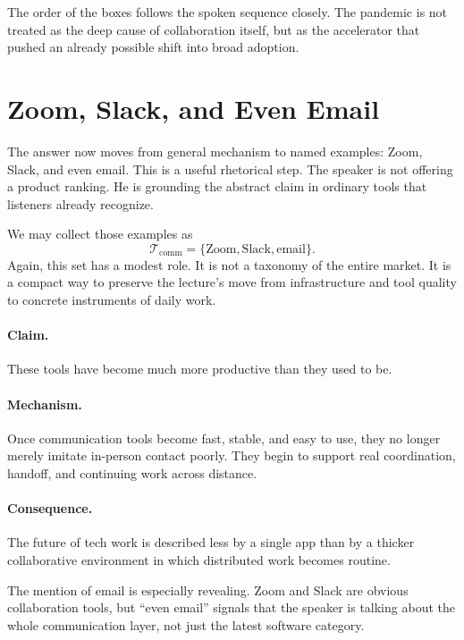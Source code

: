 The order of the boxes follows the spoken sequence closely. The pandemic is not treated as the deep cause of collaboration itself, but as the accelerator that pushed an already possible shift into broad adoption.

\section{Zoom, Slack, and Even Email}

The answer now moves from general mechanism to named examples: Zoom, Slack, and even email. This is a useful rhetorical step. The speaker is not offering a product ranking. He is grounding the abstract claim in ordinary tools that listeners already recognize.

We may collect those examples as
\begin{equation}
\mathcal{T}_{\mathrm{comm}}=\{\mathrm{Zoom},\mathrm{Slack},\mathrm{email}\}.
\end{equation}
Again, this set has a modest role. It is not a taxonomy of the entire market. It is a compact way to preserve the lecture's move from infrastructure and tool quality to concrete instruments of daily work.

\paragraph{Claim.} These tools have become much more productive than they used to be.

\paragraph{Mechanism.} Once communication tools become fast, stable, and easy to use, they no longer merely imitate in-person contact poorly. They begin to support real coordination, handoff, and continuing work across distance.

\paragraph{Consequence.} The future of tech work is described less by a single app than by a thicker collaborative environment in which distributed work becomes routine.

The mention of email is especially revealing. Zoom and Slack are obvious collaboration tools, but ``even email'' signals that the speaker is talking about the whole communication layer, not just the latest software category.

